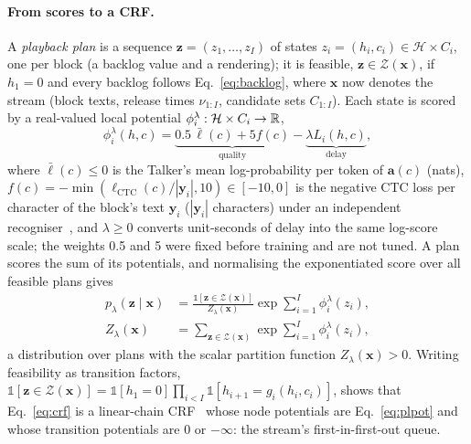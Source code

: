 \paragraph{From scores to a CRF.} A \emph{playback plan} is a sequence $\bm{z}=(z_1,\dots,z_I)$ of states
$z_i=(h_i,c_i)\in\mathcal{H}\times C_i$, one per block (a backlog value and a rendering); it is feasible,
$\bm{z}\in\mathcal{Z}(\bm{x})$, if $h_1=0$ and every backlog follows Eq.~\eqref{eq:backlog}, where $\bm{x}$ now denotes
the stream (block texts, release times $\nu_{1:I}$, candidate sets $C_{1:I}$). Each state is scored by a real-valued
local potential $\phi^\lambda_i:\mathcal{H}\times C_i\to\mathbb{R}$,
\begin{equation}
\phi^\lambda_i(h,c)=\underbrace{0.5\,\bar{\ell}(c)+5f(c)}_{\text{quality}}-\underbrace{\lambda L_i(h,c)}_{\text{delay}},
\label{eq:plpot}
\end{equation}
where $\bar{\ell}(c)\le0$ is the Talker's mean log-probability per token of $\bm{a}(c)$ (nats),
$f(c)=-\min(\ell_\text{CTC}(c)/|\bm{y}_i|,10)\in[-10,0]$ is the negative CTC loss per character of the block's text
$\bm{y}_i$ ($|\bm{y}_i|$ characters) under an independent recogniser~\citep{baevski2020wav2vec}, and $\lambda\ge0$
converts unit-seconds of delay into the same log-score scale; the weights 0.5 and 5 were fixed before training and are
not tuned. A plan scores the sum of its potentials, and normalising the exponentiated score over all feasible plans gives
\begin{equation}
\begin{aligned}
p_\lambda(\bm{z}\mid\bm{x})&=\frac{\mathds{1}[\bm{z}\in\mathcal{Z}(\bm{x})]}{Z_\lambda(\bm{x})}\exp\sum_{i=1}^{I}\phi^\lambda_i(z_i),\\
Z_\lambda(\bm{x})&=\sum_{\bm{z}\in\mathcal{Z}(\bm{x})}\exp\sum_{i=1}^{I}\phi^\lambda_i(z_i),
\end{aligned}
\label{eq:crf}
\end{equation}
a distribution over plans with the scalar partition function $Z_\lambda(\bm{x})>0$. Writing feasibility as transition
factors, $\mathds{1}[\bm{z}\in\mathcal{Z}(\bm{x})]=\mathds{1}[h_1=0]\prod_{i<I}\mathds{1}[h_{i+1}=g_i(h_i,c_i)]$, shows
that Eq.~\eqref{eq:crf} is a linear-chain CRF~\citep{lafferty2001crf} whose node potentials are Eq.~\eqref{eq:plpot}
and whose transition potentials are $0$ or $-\infty$: the stream's first-in-first-out queue.

